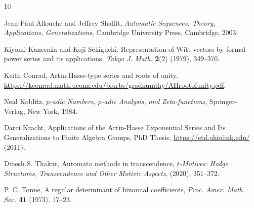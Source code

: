 \documentclass[letterpaper,oneside, 10pt]{amsart}
\theoremstyle{definition}
\numberwithin{equation}{section}
\begin{document}
\begin{thebibliography}{10}\footnotesize

Jean-Paul Allouche and Jeffrey Shallit,
{\it Automatic Sequences: Theory,  Applications,  Generalizations},
Cambridge University Press, Cambridge, 2003. 

 Kiyomi Kanesaka and Koji Sekiguchi,
Representation of Witt vectors by formal power series and its applications,
{\it Tokyo J. Math.} \textbf{2}(2) (1979), 349--370.

Keith Conrad,
Artin-Hasse-type series and roots of unity,
\url{https://kconrad.math.uconn.edu/blurbs/gradnumthy/AHrootofunity.pdf}.

Neal Koblitz,
{\it $p$-adic Numbers,  $p$-adic Analysis, and Zeta-functions},
Springer-Verlag, New York, 1984.

Darci Kracht,
Applications of the Artin-Hasse Exponential Series and Its Generalizations to Finite Algebra Groups,
PhD Thesis,  \url{https://etd.ohiolink.edu/} (2011).

Dinesh S. Thakur,
Automata methods in transcendence,
\textit{$t$-Motives: Hodge Structures, Transcendence and Other Motivic Aspects}, (2020), 351--372.

P. C. Tonne,
A regular determinant of binomial coefficients,
\textit{Proc. Amer. Math. Soc.} \textbf{41} (1973), 17--23.

\end{thebibliography}
\end{document}
